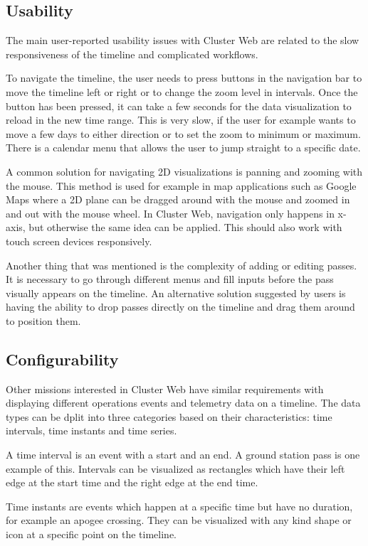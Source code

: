 \subsection{Usability}
The main user-reported usability issues with Cluster Web are related to the slow responsiveness of the timeline and complicated workflows. 

To navigate the timeline, the user needs to press buttons in the navigation bar to move the timeline left or right or to change the zoom level in intervals. Once the button has been pressed, it can take a few seconds for the data visualization to reload in the new time range. This is very slow, if the user for example wants to move a few days to either direction or to set the zoom to minimum or maximum. There is a calendar menu that allows the user to jump straight to a specific date.

A common solution for navigating 2D visualizations is panning and zooming with the mouse. This method is used for example in map applications such as Google Maps where a 2D plane can be dragged around with the mouse and zoomed in and out with the mouse wheel. In Cluster Web, navigation only happens in x- axis, but otherwise the same idea can be applied. This should also work with touch screen devices responsively.

Another thing that was mentioned is the complexity of adding or editing passes. It is necessary to go through different menus and fill inputs before the pass visually appears on the timeline. An alternative solution suggested by users is having the ability to drop passes directly on the timeline and drag them around to position them.

\subsection{Configurability}
Other missions interested in Cluster Web have similar requirements with displaying different operations events and telemetry data on a timeline. The data types can be dplit into three categories based on their characteristics: time intervals, time instants and time series.

A time interval is an event with a start and an end. A ground station pass is one example of this. Intervals can be visualized as rectangles which have their left edge at the start time and the right edge at the end time.

Time instants are events which happen at a specific time but have no duration, for example an apogee crossing. They can be visualized with any kind shape or icon at a specific point on the timeline.

